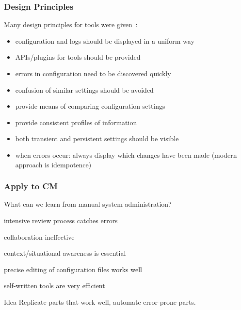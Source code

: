 \begin{frame}
	\frametitle{Design Principles \cite{haber2007design}}

	Many design principles for tools were given~\cite{haber2007design}:

	\begin{itemize}[<+-| alert@+>]
	\item configuration and logs should be displayed in a uniform way
	\item APIs/plugins for tools should be provided
	\item errors in configuration need to be discovered quickly
	\item confusion of similar settings should be avoided
	\item provide means of comparing configuration settings
	\item provide consistent profiles of information
	\item both transient and persistent settings should be visible
	\item when errors occur: always display which changes have been made (modern approach is idempotence)
	\end{itemize}
\end{frame}

\begin{frame}
	\frametitle{Apply to CM}

	What can we learn from manual system administration?

	\begin{description}[<+-| alert@+>]
	\item[$+$] intensive review process catches errors
	\item[$-$] collaboration ineffective
	\item[$-$] context/situational awareness is essential
	\item[$+$] precise editing of configuration files works well
	\item[$+$] self-written tools are very efficient
	\end{description}

	\pause[\thebeamerpauses]  %

	\begin{alertblock}{Idea}
	Replicate parts that work well, automate error-prone parts.
	\end{alertblock}
\end{frame}

